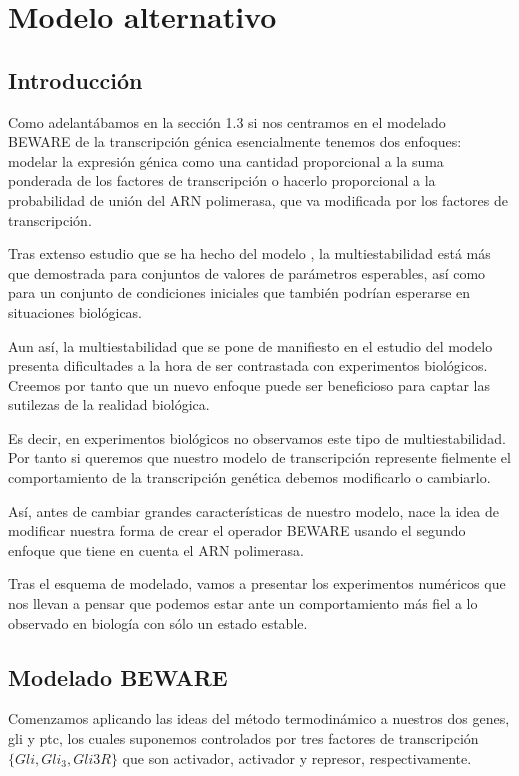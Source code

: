 \chapter{Modelo alternativo}

\label{ch:modelo_alternativo}

\section{Introducción}

Como adelantábamos en la sección 1.3 si nos centramos en el modelado BEWARE de la transcripción génica esencialmente tenemos dos enfoques: modelar la expresión génica como una cantidad proporcional a la suma ponderada de los factores de transcripción o hacerlo proporcional a la probabilidad de unión del ARN polimerasa, que va modificada por los factores de transcripción.

Tras extenso estudio que se ha hecho del modelo \cite{schaffer}, la multiestabilidad está más que demostrada para conjuntos de valores de parámetros esperables, así como para un conjunto de condiciones iniciales que también podrían esperarse en situaciones biológicas. 

Aun así, la multiestabilidad que se pone de manifiesto en el estudio del modelo presenta dificultades a la hora de ser contrastada con experimentos biológicos. Creemos por tanto que un nuevo enfoque puede ser beneficioso para captar las sutilezas de la realidad biológica.

Es decir, en experimentos biológicos no observamos este tipo de multiestabilidad. Por tanto si queremos que nuestro modelo de transcripción represente fielmente el comportamiento de la transcripción genética debemos modificarlo o cambiarlo.

Así, antes de cambiar grandes características de nuestro modelo, nace la idea de modificar nuestra forma de crear el operador BEWARE usando el segundo enfoque que tiene en cuenta el ARN polimerasa. 

Tras el esquema de modelado, vamos a presentar los experimentos numéricos que nos llevan a pensar que podemos estar ante un comportamiento más fiel a lo observado en biología con sólo un estado estable. 

\section{Modelado BEWARE}
Comenzamos aplicando las ideas del método termodinámico a nuestros dos genes, gli y ptc, los cuales suponemos controlados por tres factores de transcripción $\{Gli, Gli_3, Gli3R\} $ que son activador, activador y represor, respectivamente.

